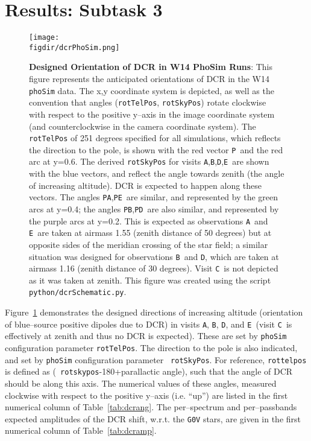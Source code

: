 \documentclass[prd, nofootinbib, floatfix, 11pt, tightenlines, times]{article}
\def\figdir{../figures}
\def\A{{\tt A}}
\def\B{{\tt B}}
\def\C{{\tt C}}
\def\D{{\tt D}}
\def\E{{\tt E}}
\def\P{{\tt P}}
\begin{document}
\section{Results: Subtask 3 \label{sec:task3}}

\begin{figure}[!ht]
  \centering
  \texttt{[image: \\figdir/dcrPhoSim.png]}
  \caption{{\bf Designed Orientation of DCR in W14 PhoSim Runs}: This
    figure represents the anticipated orientations of DCR in the W14
    {\tt phoSim} data.  The x,y coordinate system is depicted, as well
    as the convention that angles ({\tt rotTelPos}, {\tt rotSkyPos})
    rotate clockwise with respect to the positive y--axis in the image
    coordinate system (and counterclockwise in the camera coordinate
    system).  The {\tt rotTelPos} of 251 degrees specified for all
    simulations, which reflects the direction to the pole, is shown
    with the red vector \P\ and the red arc at y=0.6.  The derived
    {\tt rotSkyPos} for visits \A,\B,\D,\E\ are shown with the blue
    vectors, and reflect the angle towards zenith (the angle of
    increasing altitude).  DCR is expected to happen along these
    vectors.  The angles \P\A,\P\E\ are similar, and represented by
    the green arcs at y=0.4; the angles \P\B,\P\D\ are also similar,
    and represented by the purple arcs at y=0.2.  This is expected as
    observations \A\ and \E\ are taken at airmass 1.55 (zenith
    distance of 50 degrees) but at opposite sides of the meridian
    crossing of the star field; a similar situation was designed for
    observations \B\ and \D, which are taken at airmass 1.16 (zenith
    distance of 30 degrees).  Visit \C\ is not depicted as it was
    taken at zenith.  This figure was created using the script {\tt
      python/dcrSchematic.py}.}
  \label{fig:phosimdcr}
\end{figure}

Figure~\ref{fig:phosimdcr} demonstrates the designed directions of
increasing altitude (orientation of blue--source positive dipoles due
to DCR) in visits \A, \B, \D, and \E\ (visit \C\ is effectively at
zenith and thus no DCR is expected).  These are set by {\tt phoSim}
configuration parameter {\tt rotTelPos}.  The direction to the pole is
also indicated, and set by {\tt phoSim} configuration parameter {\tt
  rotSkyPos}.  For reference, {\tt rottelpos} is defined as ({\tt
  rotskypos}-180+parallactic angle), such that the angle of DCR should
be along this axis.  The numerical values of these angles, measured
clockwise with respect to the positive y--axis (i.e. ``up'') are
listed in the first numerical column of Table~\ref{tab:dcrang}.  The
per--spectrum and per--passbands expected amplitudes of the DCR shift,
w.r.t. the {\tt G0V} stars, are given in the first numerical column of
Table~\ref{tab:dcramp}.
\end{document}
